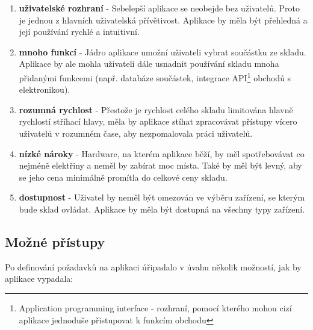 \documentclass[12pt, a4paper, oneside]{article}
\begin{document}
\begin{enumerate}
\item \textbf{uživatelské rozhraní} - Sebelepší aplikace se neobejde bez uživatelů. Proto je jednou z hlavních uživatelská přívětivost. Aplikace by měla být přehledná a její používání rychlé a intuitivní.
\item \textbf{mnoho funkcí} - Jádro aplikace umožní uživateli vybrat součástku ze skladu. Aplikace by ale mohla uživateli dále usnadnit používání skladu mnoha přidanými funkcemi (např. databáze součástek, integrace API\footnote{Application programming interface - rozhraní, pomocí kterého mohou cizí aplikace jednoduše přistupovat k funkcím obchodu} obchodů s elektronikou).
\item \textbf{rozumná rychlost} - Přestože je rychlost celého skladu limitována hlavně rychlostí stříhací hlavy, měla by aplikace stíhat zpracovávat přístupy vícero uživatelů v rozumném čase, aby nezpomalovala práci uživatelů.
\item \textbf{nízké nároky} - Hardware, na kterém aplikace běží, by měl spotřebovávat co nejméně elektřiny a neměl by zabírat moc místa. Také by měl být levný, aby se jeho cena minimálně promítla do celkové ceny skladu.
\item \textbf{dostupnost} - Uživatel by neměl být omezován ve výběru zařízení, se kterým bude sklad ovládat. Aplikace by měla být dostupná na všechny typy zařízení.
\end{enumerate}

\subsection{Možné přístupy}

Po definování požadavků na aplikaci úřipadalo v úvahu několik možností, jak by aplikace vypadala:
\end{document}
